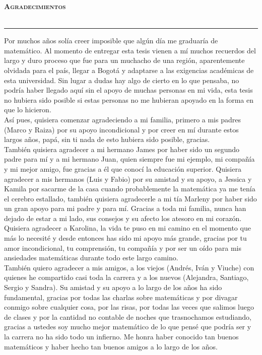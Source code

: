 
\newpage
\thispagestyle{empty}
\begin{Huge}
    \bfseries \selectfont \scshape \hfill Agradecimientos \\\\
    \rule[0.5ex]{\linewidth}{1pt}
    \vspace*{1cm}
\end{Huge}

Por muchos años solía creer imposible que algún día me graduaría de matemático. Al momento de entregar esta tesis vienen a mí muchos recuerdos del largo y duro proceso que fue para un muchacho de una región, aparentemente olvidada para el país, llegar a Bogotá y adaptarse a las exigencias académicas de esta universidad. Sin lugar a dudas hay algo  de cierto en lo que pensaba, no podría haber llegado aquí sin el apoyo  de muchas personas en mi vida, esta tesis no hubiera sido posible si estas personas no me hubieran apoyado en la forma en que lo hicieron.\\

Así pues, quisiera comenzar agradeciendo a mi familia, primero a mis padres (Marco y Raiza) por su apoyo incondicional y por creer en mí durante estos largos años, papá, sin ti nada de esto hubiera sido posible, gracias.\\

También quisiera agradecer a mi hermano James por haber  sido un segundo padre para mí y a mi hermano Juan, quien siempre fue mi ejemplo, mi compañía y mi mejor amigo, fue gracias a él que conocí la educación superior. Quisiera agradecer a mis hermanos (Luis y Fabio) por su amistad y su apoyo, a Jessica y Kamila por sacarme de la casa cuando probablemente la matemática ya me tenía el cerebro estallado, también quisiera agradecerle a mi tía Marleny por haber sido un gran apoyo para mi padre y para mí. Gracias a toda mi familia, nunca han dejado de estar a mi lado, sus consejos y su afecto los atesoro en mi corazón.\\

Quisiera agradecer a Karolina, la vida te puso en mi camino en el momento que más lo necesité y desde entonces has sido mi apoyo más grande, gracias por tu amor incondicional, tu comprensión, tu compañía y por ser un oído para mis ansiedades matemáticas durante todo este largo camino.\\

También quiero agradecer a mis amigos, a los viejos (Andrés, Iván y Viuche) con quienes he compartido casi toda la carrera y a los nuevos (Alejandra, Santiago, Sergio y Sandra). Su amistad y su apoyo a lo largo de los años ha sido fundamental, gracias por todas las charlas sobre matemáticas y por divagar conmigo sobre cualquier cosa, por las risas, por todas las veces que salimos luego de clases y por la cantidad no contable de noches que trasnochamos estudiando, gracias a ustedes soy mucho mejor matemático de lo que pensé que podría ser y la carrera no ha sido todo un infierno. Me honra haber conocido tan buenos matemáticos y haber hecho tan buenos amigos a lo largo de los años.\\

